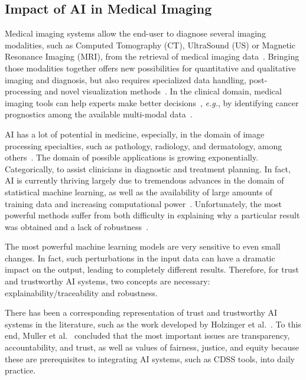 \subsection{Impact of AI in Medical Imaging}
\label{sec:chap004002001}

Medical imaging systems allow the end-user to diagnose several imaging modalities, such as Computed Tomography (CT), UltraSound (US) or Magnetic Resonance Imaging (MRI), from the retrieval of medical imaging data~\cite{WO2022071818A1, faraji2019radiologic, seifabadi2019correlation}.
Bringing those modalities together offers new possibilities for quantitative and qualitative imaging and diagnosis, but also requires specialized data handling, post-processing and novel visualization methods~\cite{Igarashi:2016:IVS:2984511.2984537, Ocegueda-Hernandez:2016:CMN:2876456.2879485, Sousa:2017:VVR:3025453.3025566}.
In the clinical domain, medical imaging tools can help experts make better decisions~\cite{Lopes:2017:UHC:3143820.3144118}, {\it e.g.}, by identifying cancer prognostics among the available multi-modal data~\cite{calisto2017mimbcdui, lopes2018interaction}.

AI has a lot of potential in medicine, especially, in the domain of image processing specialties, such as pathology, radiology, and dermatology, among others~\cite{EVANS2022281, MULLER202267}.
The domain of possible applications is growing exponentially.
Categorically, to assist clinicians in diagnostic and treatment planning.
In fact, AI is currently thriving largely due to tremendous advances in the domain of statistical machine learning, as well as the availability of large amounts of training data and increasing computational power~\cite{10.1145/3399715.3399744}.
Unfortunately, the most powerful methods suffer from both difficulty in explaining why a particular result was obtained and a lack of robustness~\cite{make4020026}.

The most powerful machine learning models are very sensitive to even small changes.
In fact, such perturbations in the input data can have a dramatic impact on the output, leading to completely different results.
Therefore, for trust and trustworthy AI systems, two concepts are necessary: explainability/traceability and robustness.

There has been a corresponding representation of trust and trustworthy AI systems in the literature, such as the work developed by Holzinger et al.~\cite{10.1007/978-3-030-93736-2_33}.
To this end, Muller et al.~\cite{9473208} concluded that the most important issues are transparency, accountability, and trust, as well as values of fairness, justice, and equity because these are prerequisites to integrating AI systems, such as CDSS tools, into daily practice.

